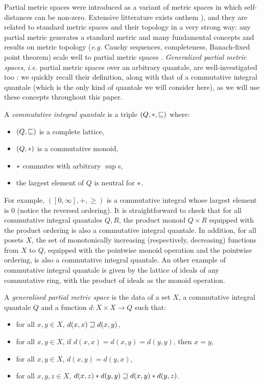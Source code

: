 Partial metric spaces were introduced as a variant of metric spaces in which self-distances can be non-zero. Extensive litterature exists onthem \cite{bkmp:partial-metrics, doi:10.1111/j.1749-6632.1994.tb44144.x, Samet:2013aa}), and they are related to standard metric spaces and their topology in a very strong way: any partial metric generates a standard metric and many fundamental concepts and results on metric topology (\textit{e.g.} Cauchy sequences, completeness, Banach-fixed point theorem) scale well to partial metric spaces \cite{bkmp:partial-metrics, doi:10.1111/j.1749-6632.1994.tb44144.x}.
\emph{Generalized partial metric spaces}, \textit{i.e.} partial metric spaces over an arbitrary quantale, are well-investigated too \cite{AGT2000,AGT7849}: we quickly recall their definition, along with that of a commutative integral quantale (which is the only kind of quantale we will consider here), as we will use these concepts throughout this paper.

\begin{definition} A \emph{commutative integral quantale} is a triple $(Q, \mathbin{\ast}, \sqsubseteq)$ where:
\begin{itemize}
\item $(Q, \sqsubseteq)$ is a complete lattice,
\item $(Q, \mathbin{\ast})$ is a commutative monoid,
\item $\mathbin{\ast}$ commutes with arbitrary $\sup$s,
\item the largest element of $Q$ is neutral for $\mathbin{\ast}$.
\end{itemize}
\end{definition}

For example, $([0,\infty], +, \geq)$ is a commutative integral whose largest element is $0$ (notice the reversed ordering). It is straightforward to check that for all commutative integral quantales $Q,R$, the product monoid $Q \times R$ equipped with the product ordering is also a commutative integral quantale. In addition, for all posets $X$, the set of monotonically increasing (respectively, decreasing) functions from $X$ to $Q$, equipped with the pointwise monoid operation and the pointwise ordering, is also a commutative integral quantale. An other example of commutative integral quantale is given by the lattice of ideals of any commutative ring, with the product of ideals as the monoid operation.

\begin{definition} A \emph{generalised partial metric space} is the data of a set $X$, a commutative integral quantale $Q$ and a function $d : X \times X \to Q$ such that: \begin{itemize}
\item for all $x,y \in X$, $d(x,x) \sqsupseteq d(x,y)$,
\item for all $x,y \in X$, if $d(x,x) = d(x,y) = d(y,y)$, then $x = y$,
\item for all $x,y \in X$, $d(x,y) = d(y,x)$,
\item for all $x,y,z \in X$, $d(x,z) \mathbin{\ast} d(y,y) \sqsupseteq d(x,y) \mathbin{\ast} d(y,z)$.
\end{itemize}
\end{definition}

